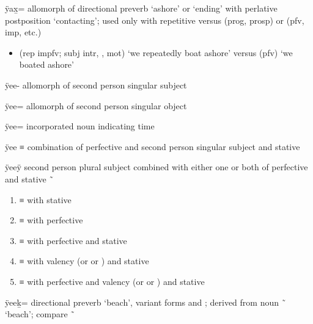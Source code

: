 \begin{morphdesc}[resume*=alphalist]
\item[ÿax̱=]
	allomorph of directional preverb  ‘ashore’ or ‘ending’
	with perlative postposition  ‘contacting’;
	used only with repetitive versus  (prog, prosp) or  (pfv, imp, etc.)
	\begin{itemize}
	\item	{} (rep impfv; subj intr, , mot) ‘we repeatedly boat ashore’\newline
		versus  (pfv) ‘we boated ashore’
	\end{itemize}

\item[ÿee-]
	allomorph of second person singular subject 

\item[ÿee=]
	allomorph of second person singular object 

\item[ÿee=]
	incorporated noun indicating time

\item[ÿee]
	≡ 
	combination of perfective 
		and second person singular subject 
		and stative 

\item[ÿeeÿ]
	second person plural subject  combined with either one or both of
		perfective 
		and stative  \~\ 
	\begin{enumerate}
	\item	{} ≡ 
		with stative 
	\item	{} ≡ 
		with perfective 
	\item	{} ≡ 
		with perfective 
		and stative 
	\item	{} ≡ 
		with valency 
			(or   or  )
		and stative 
	\item	{} ≡ 
		with perfective 
		and valency 
			(or   or  )
		and stative 
	\end{enumerate}

\item[ÿeeḵ=]
	directional preverb ‘beach’, variant forms  and ;
	derived from noun  \~\  ‘beach’;
	compare  \~\ 


\end{morphdesc}
